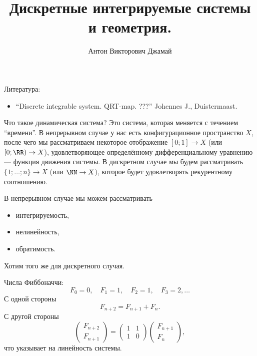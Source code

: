 \documentclass[12pt,a4paper]{article}
\title{Дискретные интегрируемые системы и геометрия.}
\author{Антон Викторович Джамай}
\begin{document}
    \maketitle

    Литература:
    \begin{itemize}
        \item ``Discrete integrable system. QRT-map. ???'' Johennes J., Duistermaast.
    \end{itemize}

    Что такое динамическая система? Это система, которая меняется с течением ``времени''. В непрерывном случае у нас есть конфигурационное пространство $X$, после чего мы рассматриваем некоторое отображение $[0; 1] \to X$ (или $[0; \RR) \to X$), удовлетворяющее определённому дифференциальному уравнению --- функция движения системы. В дискретном случае мы будем рассматривать $\{1; \dots; n\} \to X$ (или $\NN \to X$), которое будет удовлетворять рекурентному соотношению.

    В непрерывном случае мы можем рассматривать
    \begin{itemize}
        \item интегрируемость,
        \item нелинейность,
        \item обратимость.
    \end{itemize}
    Хотим того же для дискретного случая.

    \begin{example}
        Числа Фиббоначчи:
        \[F_0 = 0, \quad F_1 = 1, \quad F_2 = 1, \quad F_3 = 2, \dots\]
        С одной стороны
        \[F_{n+2} = F_{n+1} + F_n.\]
        С другой стороны
        \[
            \begin{pmatrix}
                F_{n+2}\\
                F_{n+1}
            \end{pmatrix}
            =
            \begin{pmatrix}
                1& 1\\
                1& 0
            \end{pmatrix}
            \begin{pmatrix}
                F_{n+1}\\
                F_n
            \end{pmatrix},
        \]
        что указывает на линейность системы.
    \end{example}
\end{document}

